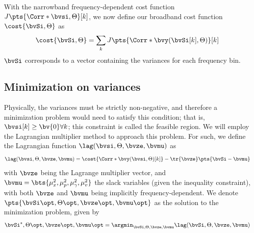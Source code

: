 With the narrowband frequency-dependent cost function $J\pts{\Corr*{\bvsi,\Theta}}[k]$, we now define our broadband cost function $\cost{\bvSi,\Theta}$ as
\begin{equation}
	\label{eq:sec3:cost_function_broadband}
	\cost{\bvSi,\Theta} = \sum_{k} J\pts{\Corr*{\bvy}(\bvSi[k], \Theta)}[k]
\end{equation}
$\bvSi$ corresponds to a vector containing the variances for each frequency bin.

\subsection{Minimization on variances}
Physically, the variances must be strictly non-negative, and therefore a minimization problem would need to satisfy this condition; that is, $\bvsi[k] \geq \bv{0}\forall k$; this constraint is called the feasible region. We will employ the Lagrangian multiplier method \cite{rockafellar_lagrange_1993} to approach this problem. For such, we define the Lagrangian function $\lag(\bvsi,\Theta,\bvze,\bvmu)$ as
\begin{equation}
	\label{eq:sec3:lagrangian_function}
	\lag(\bvsi,\Theta,\bvze,\bvmu) = \cost{\Corr*{\bvy}(\bvsi,\Theta)[k]} - \tr{\bvze}\pts{\bvSi - \bvmu}
\end{equation}
with $\bvze$ being the Lagrange multiplier vector, and $\bvmu = \bts{\mu_x^2,\mu_p^2,\mu_\gamma^2,\mu_v^2}$ the slack variables (given the inequality constraint), with both $\bvze$ and $\bvmu$ being implicitly frequency-dependent. We denote $\pts{\bvSi\opt,\Theta\opt,\bvze\opt,\bvmu\opt}$ as the solution to the minimization problem, given by
\begin{equation}
	\label{eq:sec3:lagrangian_multiplier_eq}
	\bvSi^{\star},\Theta\opt,\bvze\opt,\bvmu\opt = \argmin_{\bvSi,\Theta,\bvze,\bvmu} \lag(\bvSi,\Theta,\bvze,\bvmu)
\end{equation}

